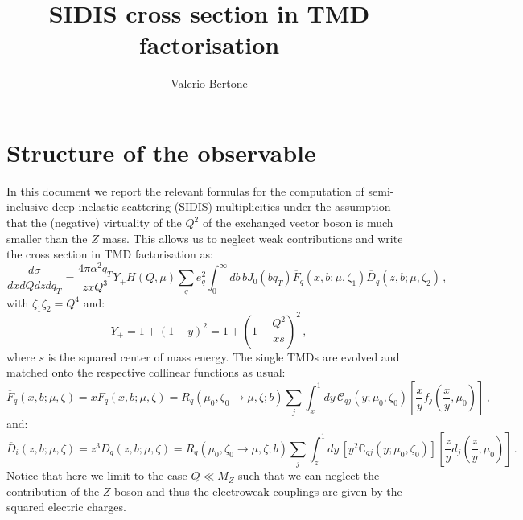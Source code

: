\documentclass[10pt,a4paper]{article}
\begin{document}
\title{SIDIS cross section in TMD factorisation}

\author{Valerio Bertone}

\maketitle

\tableofcontents{}

\section{Structure of the observable}

In this document we report the relevant formulas for the computation
of semi-inclusive deep-inelastic scattering (SIDIS) multiplicities
under the assumption that the (negative) virtuality of the $Q^2$ of
the exchanged vector boson is much smaller than the $Z$ mass. This
allows us to neglect weak contributions and write the cross section
in TMD factorisation as:
\begin{equation}\label{eq:sidisxsec}
  \frac{d\sigma}{dxdQdz d q_T} = \frac{4\pi \alpha^2q_T}{z x Q^3}Y_+ H(Q,\mu) \sum_q e_q^2
  \int_0^\infty db \,b J_0\left(bq_T\right)\overline{F}_q(x,b;\mu,\zeta_1) \overline{D}_{q}(z,b;\mu,\zeta_2)\,,
\end{equation}
with $\zeta_1\zeta_2=Q^4$ and:
\begin{equation}
  Y_+=1+(1-y)^2=1+\left(1-\frac{Q^2}{xs}\right)^2\,,
\end{equation}
where $s$ is the squared center of mass energy. The single TMDs are
evolved and matched onto the respective collinear functions as usual:
\begin{equation}
\overline{F}_q(x,b;\mu,\zeta) =xF_q(x,b;\mu,\zeta) = R_q(\mu_0,\zeta_0\rightarrow \mu,\zeta;b) \sum_{j}\int_x^1dy\,\mathcal{C}_{qj}(y;\mu_0,\zeta_0)\left[\frac{x}{y}f_j\left(\frac{x}{y},\mu_0\right)\right]\,,
\end{equation}
and:
\begin{equation}
\overline{D}_{i}(z,b;\mu,\zeta) =z^3D_{q}(z,b;\mu,\zeta) = R_q(\mu_0,\zeta_0\rightarrow \mu,\zeta;b) \sum_{j}\int_z^1dy\,\left[y^2\mathbb{C}_{qj}(y;\mu_0,\zeta_0)\right]\left[\frac{z}{y}d_j\left(\frac{z}{y},\mu_0\right)\right]\,.
\end{equation}
Notice that here we limit to the case $Q\ll M_Z$ such that we can
neglect the contribution of the $Z$ boson and thus the electroweak
couplings are given by the squared electric charges.
\end{document}
